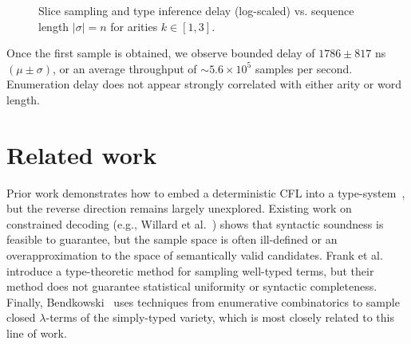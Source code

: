 \documentclass[sigplan,nonacm]{acmart}\settopmatter{printfolios=false,printccs=false,printacmref=false}
\begin{document}
\begin{figure}[H]
\begin{minipage}{0.49\columnwidth}
    \end{minipage}
    \vspace{-0.9em}
    \caption{Slice sampling and type inference delay (log-scaled) vs. sequence length $|\sigma|=n$ for arities $k\in [1,3]$.}
    \vspace{-0.6em}
  \end{figure}

  Once the first sample is obtained, we observe bounded delay of $1786 \pm 817 $ ns $(\mu \pm \sigma)$, or an average throughput of $\sim 5.6\times 10^5$ samples per second. Enumeration delay does not appear strongly correlated with either arity or word length.

  \section{Related work}

  Prior work demonstrates how to embed a deterministic CFL into a type-system~\cite{roth2021study}, but the reverse direction remains largely unexplored. Existing work on constrained decoding (e.g., Willard et al.~\cite{willard2023efficient}) shows that syntactic soundness is feasible to guarantee, but the sample space is often ill-defined or an overapproximation to the space of semantically valid candidates. Frank et al.~\cite{frank2024generating} introduce a type-theoretic method for sampling well-typed terms, but their method does not guarantee statistical uniformity or syntactic completeness. Finally, Bendkowski~\cite{bendkowski2016boltzmann} uses techniques from enumerative combinatorics to sample closed $\lambda$-terms of the simply-typed variety, which is most closely related to this line of work.
\end{document}
